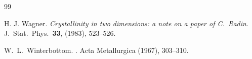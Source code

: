 \documentclass[reqno]{amsart}
\theoremstyle{plain}
\theoremstyle{definition}
\numberwithin{equation}{section}
\begin{document}
\begin{thebibliography}{99}
 


 {\sc H. J. Wagner}. {\em Crystallinity in two dimensions: a note on a paper of C.~Radin}.  J.\ Stat.\ Phys.\   {\bf 33},  (1983),  523--526.

  
  {\sc W.~L.~Winterbottom}.
  .
  \newblock Acta Metallurgica
   (1967), 303--310.







\end{thebibliography}
 
\end{document}
